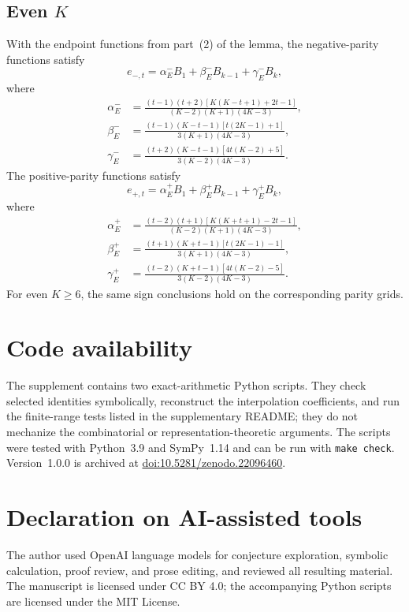 \documentclass[11pt]{article}
\theoremstyle{plain}
\theoremstyle{remark}
\begin{document}
\subsection*{Even \(K\)}

With the endpoint functions from part~(2) of the lemma, the negative-parity
functions satisfy
\begin{equation}\label{eq:even-minus-interp}
 e_{-,t}=\alpha^-_EB_1+\beta^-_EB_{k-1}+\gamma^-_EB_k,
\end{equation}
where
\begin{align*}
 \alpha^-_E&=\frac{(t-1)(t+2)[K(K-t+1)+2t-1]}
 {(K-2)(K+1)(4K-3)},\\
 \beta^-_E&=\frac{(t-1)(K-t-1)[t(2K-1)+1]}
 {3(K+1)(4K-3)},\\
 \gamma^-_E&=\frac{(t+2)(K-t-1)[4t(K-2)+5]}
 {3(K-2)(4K-3)}.
\end{align*}
The positive-parity functions satisfy
\begin{equation}\label{eq:even-plus-interp}
 e_{+,t}=\alpha^+_EB_1+\beta^+_EB_{k-1}+\gamma^+_EB_k,
\end{equation}
where
\begin{align*}
 \alpha^+_E&=\frac{(t-2)(t+1)[K(K+t+1)-2t-1]}
 {(K-2)(K+1)(4K-3)},\\
 \beta^+_E&=\frac{(t+1)(K+t-1)[t(2K-1)-1]}
 {3(K+1)(4K-3)},\\
 \gamma^+_E&=\frac{(t-2)(K+t-1)[4t(K-2)-5]}
 {3(K-2)(4K-3)}.
\end{align*}
For even $K\ge6$, the same sign conclusions hold on the corresponding
parity grids.

\section*{Code availability}

The supplement contains two exact-arithmetic Python scripts.  They check
selected identities symbolically, reconstruct the interpolation
coefficients, and run the finite-range tests listed in the supplementary
README; they do not mechanize the combinatorial or representation-theoretic
arguments.  The scripts were tested with Python~3.9 and SymPy~1.14 and can
be run with \texttt{make check}.  Version~1.0.0 is archived at
\href{https://doi.org/10.5281/zenodo.22096460}{doi:10.5281/zenodo.22096460}.

\section*{Declaration on AI-assisted tools}

The author used OpenAI language models for conjecture exploration, symbolic
calculation, proof review, and prose editing, and reviewed all resulting
material.  The manuscript is licensed under CC BY 4.0; the accompanying
Python scripts are licensed under the MIT License.



\end{document}
